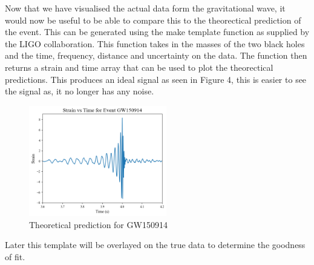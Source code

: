 \documentclass[]{article}
\begin{document}
Now that we have visualised the actual data form the gravitational wave, it would now
be useful to be able to compare this to the theorectical prediction of the event.
This can be generated using the make template function as supplied by the LIGO
collaboration. This function takes in the masses of the two black holes and
the time, frequency, distance and uncertainty on the data. The function then returns
a strain and time array that can be used to plot the theorectical predictions.
This produces an ideal signal as seen in Figure 4, this is easier to see the signal as,
it no longer has any noise.
\begin{figure}[h]
    \includegraphics[width=6cm]{images/ideal_signal_gw150914.png}
    \caption{Theoretical prediction for GW150914}
    \label{fig:ideal_signal}
\end{figure}
\newline
Later this template will be overlayed on the true data to determine the goodness of fit.
\end{document}
